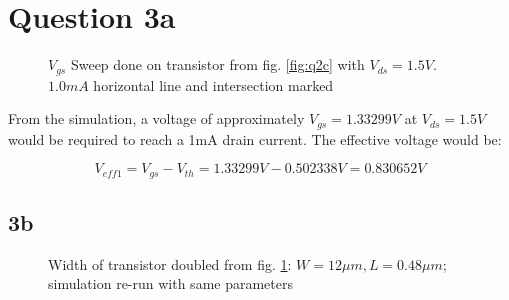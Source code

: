 \documentclass[12pt, letterpaper, notitlepage, DIV=16, BCOR=1mm, headlines=2]{scrreprt}
\begin{document}
\pagebreak
\section*{Question 3a}
\begin{figure}[!ht]
	\caption{$V_{gs}$ Sweep done on transistor from fig. \ref{fig:q2c}
  with $V_{ds} = 1.5V$. $1.0mA$ horizontal line and intersection marked}
	\label{fig:q3a}
\end{figure}

From the simulation, a voltage of approximately $V_{gs} = 1.33299V$ at $V_{ds} = 1.5V$ would be required
to reach a 1mA drain current. The effective voltage would be:

$$
	V_{eff1} = V_{gs} - V_{th} = 1.33299V -  0.502338V = 0.830652V
$$

\subsection*{3b}

\begin{figure}[!ht]
	\caption{Width of transistor doubled from fig. \ref{fig:q3a}:
  $W = 12\mu m, L = 0.48\mu m$; simulation re-run with same parameters}
	\label{fig:q3c}
\end{figure}
\end{document}
